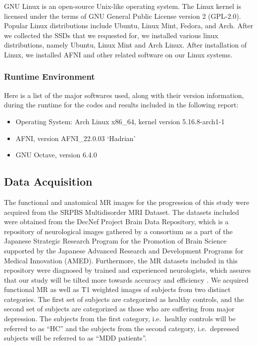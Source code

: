 \documentclass[12pt]{article}
\begin{document}
GNU Linux is an open-source Unix-like operating system. The Linux
kernel is licensed under the terms of GNU General Public License
version 2 (GPL-2.0). Popular Linux distributions include Ubuntu,
Linux Mint, Fedora, and Arch. After we collected the SSDs that we
requested for, we installed various linux distributions, namely
Ubuntu, Linux Mint and Arch Linux. After installation of Linux, we
installed AFNI and other related software on our Linux systems.

\subsubsection{Runtime Environment}%
\label{ssub:runtime_environment}

Here is a list of the major softwares used, along with their version
information, during the runtime for the codes and results included in
the following report:

\begin{itemize}[noitemsep]
  \item Operating System: Arch Linux x86\_64, kernel version
    5.16.8-arch1-1
  \item AFNI, version AFNI\_22.0.03 `Hadrian'
  \item GNU Octave, version 6.4.0


\end{itemize}

\subsection{Data Acquisition}%
\label{sub:data_acquisition}

The functional and anatomical MR images for the progression of this
study were acquired from the SRPBS Multidisorder MRI Dataset. The
datasets included were obtained from the DecNef Project Brain Data
Repository, which is a repository of neurological images gathered by a
consortium as a part of the Japanese Strategic Research Program for
the Promotion of Brain Science supported by the Japanese Advanced
Research and Development Programs for Medical Innovation (AMED).
Furthermore, the MR datasets included in this repository were
diagnosed by trained and experienced neurologists, which assures that
our study will be tilted more towards accuracy and efficiency
\cite{dataset}. We acquired functional MR as well as T1 weighted
images of subjects from two distinct categories. The first set of
subjects are categorized as healthy controls, and the second set of
subjects are categorized as those who are suffering from major
depression. The subjects from the first category, i.e.~healthy
controls will be referred to as ``HC'' and the subjects from the
second category, i.e.~depressed subjects will be referred to as ``MDD
patients''.
\end{document}
